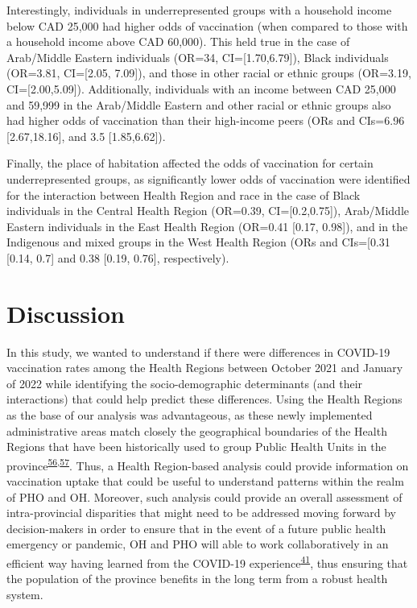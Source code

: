 \documentclass[
]{article}
\begin{document}
Interestingly, individuals in underrepresented groups with a household
income below CAD 25,000 had higher odds of vaccination (when compared to
those with a household income above CAD 60,000). This held true in the
case of Arab/Middle Eastern individuals (OR=34, CI={[}1.70,6.79{]}),
Black individuals (OR=3.81, CI={[}2.05, 7.09{]}), and those in other
racial or ethnic groups (OR=3.19, CI={[}2.00,5.09{]}). Additionally,
individuals with an income between CAD 25,000 and 59,999 in the
Arab/Middle Eastern and other racial or ethnic groups also had higher
odds of vaccination than their high-income peers (ORs and CIs=6.96
{[}2.67,18.16{]}, and 3.5 {[}1.85,6.62{]}).

Finally, the place of habitation affected the odds of vaccination for
certain underrepresented groups, as significantly lower odds of
vaccination were identified for the interaction between Health Region
and race in the case of Black individuals in the Central Health Region
(OR=0.39, CI={[}0.2,0.75{]}), Arab/Middle Eastern individuals in the
East Health Region (OR=0.41 {[}0.17, 0.98{]}), and in the Indigenous and
mixed groups in the West Health Region (ORs and CIs={[}0.31 {[}0.14,
0.7{]} and 0.38 {[}0.19, 0.76{]}, respectively).

\hypertarget{discussion}{%
\section{Discussion}\label{discussion}}

In this study, we wanted to understand if there were differences in
COVID-19 vaccination rates among the Health Regions between October 2021
and January of 2022 while identifying the socio-demographic determinants
(and their interactions) that could help predict these differences.
Using the Health Regions as the base of our analysis was advantageous,
as these newly implemented administrative areas match closely the
geographical boundaries of the Health Regions that have been
historically used to group Public Health Units in the
province\textsuperscript{\protect\hyperlink{ref-bolotin2018}{56},\protect\hyperlink{ref-ohesi}{57}}.
Thus, a Health Region-based analysis could provide information on
vaccination uptake that could be useful to understand patterns within
the realm of PHO and OH. Moreover, such analysis could provide an
overall assessment of intra-provincial disparities that might need to be
addressed moving forward by decision-makers in order to ensure that in
the event of a future public health emergency or pandemic, OH and PHO
will able to work collaboratively in an efficient way having learned
from the COVID-19
experience\textsuperscript{\protect\hyperlink{ref-ashcroft2023}{41}},
thus ensuring that the population of the province benefits in the long
term from a robust health system.
\end{document}
